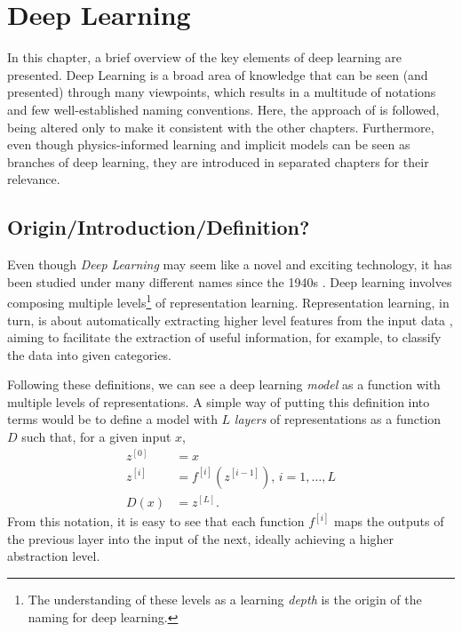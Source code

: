 \chapter{Deep Learning}\label{ch:deep-learning}

In this chapter, a brief overview of the key elements of deep learning are presented.
Deep Learning is a broad area of knowledge that can be seen (and presented) through many viewpoints, which results in a multitude of notations and few well-established naming conventions.
Here, the approach of \textcite{goodfellow_deep_2016} is followed, being altered only to make it consistent with the other chapters.
Furthermore, even though physics-informed learning and implicit models can be seen as branches of deep learning, they are introduced in separated chapters for their relevance.

\section{Origin/Introduction/Definition?}

Even though \textit{Deep Learning} may seem like a novel and exciting technology, it has been studied under many different names since the 1940s \cite{goodfellow_deep_2016}.
Deep learning involves composing multiple levels\footnote{The understanding of these levels as a learning \textit{depth} is the origin of the naming for deep learning.} of representation learning.
Representation learning, in turn, is about automatically extracting higher level features from the input data \cite{lecun_deep_2015,bengio_representation_2013}, aiming to facilitate the extraction of useful information, for example, to classify the data into given categories.

Following these definitions, we can see a deep learning \textit{model} as a function with multiple levels of representations.
A simple way of putting this definition into terms would be to define a model with $L$ \emph{layers} of representations as a function $D$ such that, for a given input $x$,
\begin{equation}\label{eq:dl-model}
\begin{split}
    z^{[0]} &= x \\
    z^{[i]} &= f^{[i]}(z^{[i-1]}),\,i=1,\ldots,L \\
    D(x) &= z^{[L]}.
\end{split}
\end{equation}
From this notation, it is easy to see that each function $f^{[i]}$ maps the outputs of the previous layer into the input of the next, ideally achieving a higher abstraction level.


